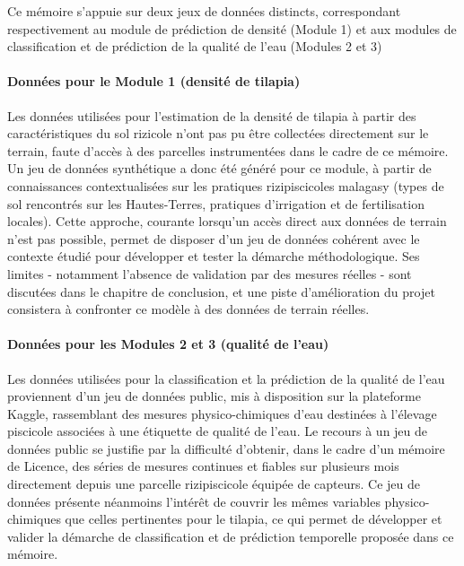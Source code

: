 \documentclass[a4paper,12pt, oneside]{article}
\begin{document}
Ce mémoire s'appuie sur deux jeux de données distincts, correspondant respectivement au module de prédiction de densité (Module 1) et aux modules de classification et de prédiction de la qualité de l'eau (Modules 2 et 3)

\paragraph{Données pour le Module 1 (densité de tilapia)\\}

Les données utilisées pour l'estimation de la densité de tilapia à partir des caractéristiques du sol rizicole n'ont pas pu être collectées directement sur le terrain, faute d'accès à des parcelles instrumentées dans le cadre de ce mémoire. Un jeu de données synthétique a donc été généré pour ce module, à partir de connaissances contextualisées sur les pratiques rizipiscicoles malagasy (types de sol rencontrés sur les Hautes-Terres, pratiques d'irrigation et de fertilisation locales). Cette approche, courante lorsqu'un accès direct aux données de terrain n'est pas possible, permet de disposer d'un jeu de données cohérent avec le contexte étudié pour développer et tester la démarche méthodologique. Ses limites - notamment l'absence de validation par des mesures réelles - sont discutées dans le chapitre de conclusion, et une piste d'amélioration du projet consistera à confronter ce modèle à des données de terrain réelles.

\paragraph{Données pour les Modules 2 et 3 (qualité de l'eau)\\}

Les données utilisées pour la classification et la prédiction de la qualité de l'eau proviennent d'un jeu de données public, mis à disposition sur la plateforme Kaggle, rassemblant des mesures physico-chimiques d'eau destinées à l'élevage piscicole associées à une étiquette de qualité de l'eau. Le recours à un jeu de données public se justifie par la difficulté d'obtenir, dans le cadre d'un mémoire de Licence, des séries de mesures continues et fiables sur plusieurs mois directement depuis une parcelle rizipiscicole équipée de capteurs. Ce jeu de données présente néanmoins l'intérêt de couvrir les mêmes variables physico-chimiques que celles pertinentes pour le tilapia, ce qui permet de développer et valider la démarche de classification et de prédiction temporelle proposée dans ce mémoire.
\end{document}
